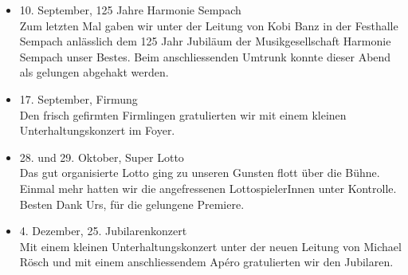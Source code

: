 \begin{history}
\begin{itemize}
        \item 10. September, 125 Jahre Harmonie Sempach\\
              Zum letzten Mal gaben wir unter der Leitung von Kobi Banz in der
              Festhalle Sempach anlässlich dem 125 Jahr Jubiläum der Musikgesellschaft Harmonie Sempach
              unser Bestes. Beim anschliessenden Umtrunk konnte dieser Abend als
              gelungen abgehakt werden.

        \item 17. September, Firmung\\
              Den frisch gefirmten Firmlingen gratulierten wir mit einem kleinen
              Unterhaltungskonzert im Foyer.

        \item 28. und 29. Oktober, Super Lotto\\
              Das gut organisierte Lotto ging zu unseren Gunsten flott über die Bühne.
              Einmal mehr hatten wir die angefressenen LottospielerInnen unter
              Kontrolle. Besten Dank Urs, für die gelungene Premiere.

        \item 4. Dezember, 25. Jubilarenkonzert\\
              Mit einem kleinen Unterhaltungskonzert unter der neuen Leitung von
              Michael Rösch und mit einem anschliessendem Apéro gratulierten wir den
              Jubilaren.



    \end{itemize}

\end{history}
